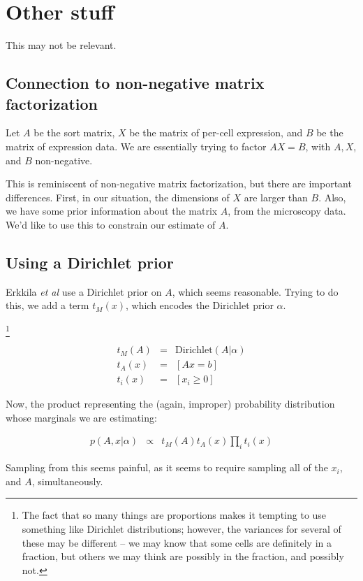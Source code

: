 \documentclass{article}
\begin{document}
\section{Other stuff}

This may not be relevant.

\subsection{Connection to non-negative matrix factorization}

Let $A$ be the sort matrix, $X$ be the matrix of per-cell expression, and
$B$ be the matrix of expression data. We are essentially trying to factor
$AX=B$, with $A, X$, and $B$ non-negative.

This is reminiscent of non-negative matrix factorization, but
there are important differences. First, in our situation,
the dimensions of $X$ are larger than $B$. Also, we have some
prior information about
the matrix $A$, from the microscopy data.
We'd like to use this to constrain our estimate of $A$.




\subsection{Using a Dirichlet prior}

Erkkila {\em et al} use a Dirichlet prior on $A$, which seems reasonable. Trying to do
this, we add a term $t_M(x)$, which encodes the Dirichlet prior $\alpha$.

\footnote{The fact that so many things are proportions makes it tempting
to use something like Dirichlet distributions; however, the variances
for several of these may be different -- we may know that some cells
are definitely in a fraction, but others we may think are possibly 
in the fraction, and possibly not.}

\begin{eqnarray}
t_M(A) & = & \mathrm{Dirichlet}(A|\alpha) \\
t_A(x) & = & [Ax = b] \\
t_i(x) & = & [x_i \ge 0]
\end{eqnarray}

Now, the product representing the (again, improper) probability distribution
whose marginals we are estimating:

\begin{eqnarray}
p(A, x|\alpha) & \propto & t_M(A) t_A(x) \prod_i t_i(x)
\end{eqnarray}

Sampling from this seems painful, as it seems to require sampling all of
the $x_i$, and $A$, simultaneously.
\end{document}
